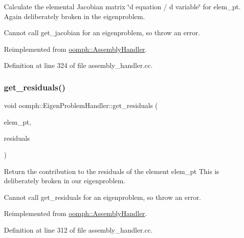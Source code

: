 Calculate the elemental Jacobian matrix \char`\"{}d equation 
/ d variable\char`\"{} for elem\+\_\+pt. Again deliberately broken in the eigenproblem. 

Cannot call get\+\_\+jacobian for an eigenproblem, so throw an error. 

Reimplemented from \hyperlink{classoomph_1_1AssemblyHandler_ad43c3d8760be0ba6ebee8d82509458e5}{oomph\+::\+Assembly\+Handler}.



Definition at line 324 of file assembly\+\_\+handler.\+cc.

\mbox{\label{classoomph_1_1EigenProblemHandler_a0dc97e08638986970c7ca5f3903c8b6d}} 
\subsubsection{\texorpdfstring{get\+\_\+residuals()}{get\_residuals()}}
{\footnotesize\ttfamily void oomph\+::\+Eigen\+Problem\+Handler\+::get\+\_\+residuals (\begin{DoxyParamCaption}\item[{\hyperlink{classoomph_1_1GeneralisedElement}{Generalised\+Element} $\ast$const \&}]{elem\+\_\+pt,  }\item[{\hyperlink{classoomph_1_1Vector}{Vector}$<$ double $>$ \&}]{residuals }\end{DoxyParamCaption})\hspace{0.3cm}{\ttfamily [virtual]}}



Return the contribution to the residuals of the element elem\+\_\+pt This is deliberately broken in our eigenproblem. 

Cannot call get\+\_\+residuals for an eigenproblem, so throw an error. 

Reimplemented from \hyperlink{classoomph_1_1AssemblyHandler_a7a6203b0ab90da62b4da2af8a26d08b3}{oomph\+::\+Assembly\+Handler}.



Definition at line 312 of file assembly\+\_\+handler.\+cc.

\mbox{\label{classoomph_1_1EigenProblemHandler_ae9e44eeceee6e19c60c51b08195730eb}} 
